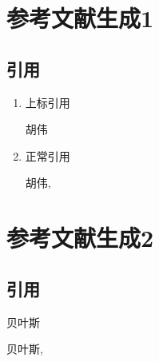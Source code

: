 \documentclass[a4paper,zihao=-4,UTF8,punct,linespread=1.56]{ctexart}
\begin{document}
\section{参考文献生成1}
\begin{refsection}

\subsection{引用}

\begin{enumerate}
	\item  上标引用
	
	
	胡伟\cite{Wuwei:2013}
	
	
	\item 正常引用
	
	胡伟\parencite{Wuwei:2013},
	
	\textcite{Wuwei:2013}
\end{enumerate}



\nocite{*}

\begin{spacing}{1.2} %
 \songti
\printbibliography[heading=subbibliography, 
	  title={\centerline{\bfseries\sffamily \zihao {-3}参考文献}}]
\end{spacing}	
			   
\end{refsection}

\section{参考文献生成2}
\begin{refsection}

\subsection{引用}

	
	贝叶斯\cite{Bayes63:classical}
	
		
	贝叶斯\parencite{Bayes63:classical},
	
	\textcite{Bayes63:classical}

\nocite{BEZOS02,ELIDRISSI94,MELLINGER96,SHELL02,Joa:1999,Yang_Hy200215,Xie_dy1997,Deng_PC2001,Shang_dy2001}

\begin{spacing}{1.2} %
	 \songti
	\printbibliography[heading=subbibliography,
	title={\centerline{\bfseries\sffamily \zihao {-3}参考文献}}]
\end{spacing}				   
\end{refsection}
\end{document}
